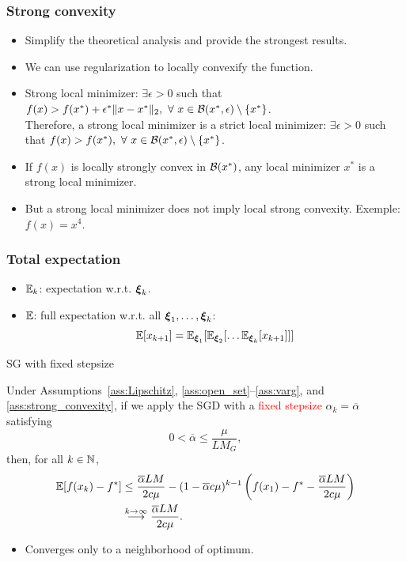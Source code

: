 \documentclass[usepdftitle=false, aspectratio=169]{beamer}
\begin{document}
\begin{frame}
\frametitle{Strong convexity}

\begin{itemize}
	\item Simplify the theoretical analysis and provide the strongest results.
	\item We can use regularization to locally convexify the function.
	\item Strong local minimizer:
        $\exists \epsilon > 0$ such that $f(x) > f(x^*) + \epsilon^*\| x-x^* \|_2,\ \forall\ x \in {\mathcal{B}}(x^*,\epsilon)\setminus\{x^*\}$.\\
       Therefore, a strong local minimizer is a strict local minimizer: $\exists \epsilon > 0$ such that $f(x) > f(x^*),\ \forall\ x \in {\mathcal{B}}(x^*,\epsilon)\setminus\{x^*\}$.
	\item If $f(x)$ is locally strongly convex in ${\mathcal{B}}(x^*)$, any local minimizer $x^*$ is a strong local minimizer.
	\item But a strong local minimizer does not imply local strong convexity. Exemple: $f(x) = x^4$.
\end{itemize}

\end{frame}

\begin{frame}
	\frametitle{Total expectation}

\begin{itemize}
\item \( {\mathbb{E}}_k \): expectation w.r.t. \( {\boldsymbol{\xi}}_k \).
\item \( {\mathbb{E}} \): full expectation w.r.t. all \( {\boldsymbol{\xi}}_1,\ldots,{\boldsymbol{\xi}}_k \):
$$
{\mathbb{E}} [ x_{k+1} ] =
{\mathbb{E}}_{{\boldsymbol{\xi}}_1}[{\mathbb{E}}_{{\boldsymbol{\xi}}_2}[\ldots{\mathbb{E}}_{{\boldsymbol{\xi}}_k}[x_{k+1}]]]
$$
\end{itemize}
	
\end{frame}

\begin{frame}{SG with fixed stepsize}

\begin{theorem}
Under Assumptions~\ref{ass:Lipschitz}, \ref{ass:open_set}--\ref{ass:varg}, and \ref{ass:strong_convexity}, if we apply the SGD with a \textcolor{red}{fixed stepsize} $\alpha_k = \overline{\alpha}$ satisfying
\begin{equation}
0 < \overline{\alpha} \leq \frac{\mu}{LM_G},
\label{eq:fixed_stepsize}
\end{equation}
then, for all $k \in {\mathbb{N}}$,
\begin{align*}
{\mathbb{E}}[ f(x_k) - f^* ] & \leq \frac{\overline{\alpha}LM}{2c\mu} - (1-\overline{\alpha}c\mu)^{k-1} \left( f(x_1) - f^* - \frac{\overline{\alpha}LM}{2c\mu} \right) \\
& \overset{k \rightarrow \infty}{\longrightarrow} \frac{\overline{\alpha}LM}{2c\mu}.
\end{align*}
\end{theorem}

\begin{itemize}
	\item Converges only to a neighborhood of optimum.
\end{itemize}

\end{frame}
\end{document}
